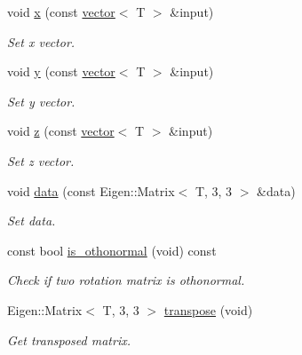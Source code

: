 \begin{DoxyCompactItemize}
void \hyperlink{classddd_1_1rotation_ab1d32f426452f5fc28844c1c7ba486c6}{x} (const \hyperlink{classddd_1_1vector}{vector}$<$ T $>$ \&input)
\begin{DoxyCompactList}\small\item\em Set x vector. \end{DoxyCompactList}\item 
void \hyperlink{classddd_1_1rotation_aeb1179a75b15819f424d212d9b09d818}{y} (const \hyperlink{classddd_1_1vector}{vector}$<$ T $>$ \&input)
\begin{DoxyCompactList}\small\item\em Set y vector. \end{DoxyCompactList}\item 
void \hyperlink{classddd_1_1rotation_add5659b127f52c0796f8eaa5997d9e20}{z} (const \hyperlink{classddd_1_1vector}{vector}$<$ T $>$ \&input)
\begin{DoxyCompactList}\small\item\em Set z vector. \end{DoxyCompactList}\item 
void \hyperlink{classddd_1_1rotation_af70341fadd500946c111eb750e4865a5}{data} (const Eigen\+::\+Matrix$<$ T, 3, 3 $>$ \&data)
\begin{DoxyCompactList}\small\item\em Set data. \end{DoxyCompactList}\item 
\mbox{\label{classddd_1_1rotation_a25fd7a4d0358a92c95b7369db99f542b}} 
const bool \hyperlink{classddd_1_1rotation_a25fd7a4d0358a92c95b7369db99f542b}{is\+\_\+othonormal} (void) const
\begin{DoxyCompactList}\small\item\em Check if two rotation matrix is othonormal. \end{DoxyCompactList}\item 
\mbox{\label{classddd_1_1rotation_ae20ad2dde12f552e8ef032e9e02733cf}} 
Eigen\+::\+Matrix$<$ T, 3, 3 $>$ \hyperlink{classddd_1_1rotation_ae20ad2dde12f552e8ef032e9e02733cf}{transpose} (void)
\begin{DoxyCompactList}\small\item\em Get transposed matrix. \end{DoxyCompactList}\item 
\mbox{\label{classddd_1_1rotation_aaeb56c20ff04304b991ae382dcd06829}} 

\end{DoxyCompactItemize}
